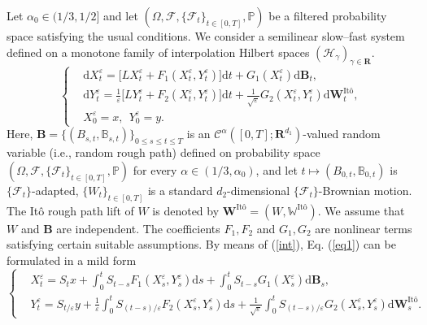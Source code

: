 \documentclass[10pt,a4paper]{article}
\numberwithin{equation}{section}
\begin{document}
Let $\alpha_0 \in (1/3,1/2]$ and let $(\Omega, \mathcal{F}, \{\mathcal{F}_t\}_{t \in [0, T]},\mathbb{P})$ be a filtered probability space satisfying the usual conditions.
We consider a semilinear slow--fast system defined on a monotone family of interpolation Hilbert spaces $(\mathcal H_\gamma)_{\gamma \in \mathbf R}$.
\begin{equation}\label{eq1}
	\left\{ \begin{aligned}
		&\mathrm{d} X_t^\varepsilon=\big[L X_t^\varepsilon+F_1 (X_t^\varepsilon,Y_t^\varepsilon)\big]\mathrm{d} t+G_1 (X_t^\varepsilon)\mathrm{d} \mathbf B_t,\\
		&\mathrm{d} Y_t^\varepsilon=\frac 1\varepsilon \big[L Y_t^\varepsilon+F_2 (X_t^\varepsilon,
		Y_t^\varepsilon)\big]\mathrm{d} t+\frac 1{\sqrt{\varepsilon}}G_2 (X_t^\varepsilon,
		Y_t^\varepsilon)  \mathrm{d} \mathbf W^{\text{It\^{o}} }_t,\\
		&X_0^\varepsilon=x, ~~ Y_0^\varepsilon=y .
	\end{aligned}  \right.
\end{equation}
Here,
$\mathbf B=\{(B_{s,t}, \mathbb B_{s,t})\}_{0\leq s\leq t\leq T}$ is an $\mathscr{C}^{\alpha}([0,T];\mathbf{R}^{d_1})$-valued random variable (i.e., random rough path) defined on probability space $(\Omega, \mathcal{F}, \{\mathcal{F}_t\}_{t \in [0, T]}, \mathbb{P})$ for every $\alpha \in (1/3, \alpha_0)$,
and let $t\mapsto (B_{0,t}, \mathbb B_{0,t})$ is $\{\mathcal{F}_t\}$-adapted,
$\{W_t\}_{t\in [0,T]}$ is a standard $d_2$-dimensional $\{\mathcal{F}_t\}$-Brownian motion.
The It\^{o} rough path lift of $W$ is denoted by $\mathbf W^{\text{It\^{o}} }=(W,\mathbb W^{\text{It\^{o}} })$.
We assume that $W$ and $\mathbf B$ are independent.
The coefficients $F_1, F_2$ and $G_1, G_2$ are nonlinear terms satisfying certain suitable assumptions.
By means of (\ref{int}), Eq. (\ref{eq1}) can be formulated in a mild form
\begin{equation}\label{solution}
	\left\{ \begin{aligned}
		&X_t^\varepsilon=S_t x+ \int_0^t S_{t-s} F_1 (X_s^\varepsilon,Y_s^\varepsilon) \mathrm{d}s+ \int_0^t S_{t-s} G_1 (X_s^\varepsilon) \mathrm{d} \mathbf B_s, \\
		&Y_t^\varepsilon= S_{t/\varepsilon} y+ \frac 1\varepsilon \int_0^t S_{(t-s)/{\varepsilon}} F_2 (X_s^\varepsilon,Y_s^\varepsilon) \mathrm{d}s +\frac 1{\sqrt{\varepsilon}}\int_0^t S_{(t-s)/{\varepsilon}} G_2 (X_s^\varepsilon,Y_s^\varepsilon) \mathrm{d} \mathbf W^{\text{It\^{o}}}_s.
	\end{aligned}  \right.
\end{equation}
\end{document}
